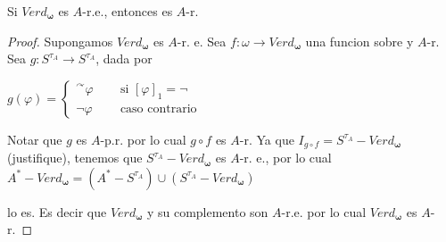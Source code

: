   \begin{lemma}
    Si \(Verd_{\mathbf{\omega }}\) es \(A\)-r.e., entonces es \(A\)-r.
  \end{lemma}
  \begin{proof}
    Supongamos \(Verd_{\mathbf{\omega }}\) es \(A\)-r. e. Sea \(f:\omega \rightarrow Verd_{\mathbf{\omega }}\) una funcion sobre y \(A\)-r. Sea \(g:S^{\tau _{A}}\rightarrow S^{\tau _{A}}\), dada por

    \(\displaystyle g(\varphi )=\left\{ \begin{array}{ccc} ^{\curvearrowright }\varphi & \;\; & \text{si }\left[ \varphi \right] _{1}=\lnot \\ \lnot \varphi & \;\; & \text{caso contrario} \end{array} \right. \)

    Notar que \(g\) es \(A\)-p.r. por lo cual \(g\circ f\) es \(A\)-r. Ya que \(I_{g\circ f}=S^{\tau _{A}}-Verd_{\mathbf{\omega }}\) (justifique), tenemos que \(S^{\tau _{A}}-Verd_{\mathbf{\omega }}\) es \(A\)-r. e., por lo cual
    \(\displaystyle A^{\ast }-Verd_{\mathbf{\omega }}=(A^{\ast }-S^{\tau _{A}})\cup (S^{\tau _{A}}-Verd_{\mathbf{\omega }}) \)

    lo es. Es decir que \(Verd_{\mathbf{\omega }}\) y su complemento son \(A\)-r.e. por lo cual \(Verd_{\mathbf{\omega }}\) es \(A\)-r.
  \end{proof}

